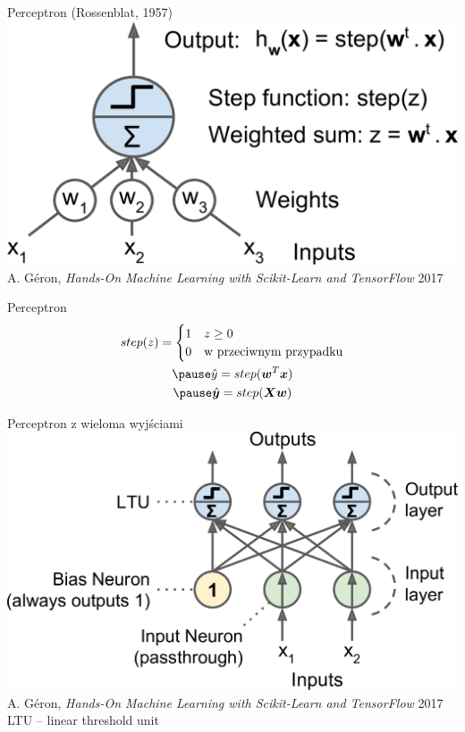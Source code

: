 \documentclass{sa}
\subtitle{Sieci neuronowe}
\renewcommand{\vec}[1]{\ensuremath\boldsymbol{#1}}
\begin{document}
\begin{frame}
\titlepage
\end{frame}

\begin{frame}{Perceptron (Rossenblat, 1957)}
\includegraphics[width=\textwidth]{perceptron.png}
{\vfill\footnotesize A. Géron, \emph{Hands-On Machine Learning with Scikit-Learn and TensorFlow} 2017}
\end{frame}

\begin{frame}{Perceptron}
\begin{gather*}
step(z) = \begin{cases} 1 & z \geq 0 \\ 0 & \text{w przeciwnym przypadku} \end{cases} \\
\pause
\hat{y} = step(\vec{w}^T\vec{x}) \\
\pause
\hat{\vec{y}} = step(\vec{X}\vec{w})
\end{gather*}
\end{frame}

\begin{frame}{Perceptron z wieloma wyjściami}
\includegraphics[width=\textwidth]{multioutput_perceptron.png}
{\vfill\footnotesize A. Géron, \emph{Hands-On Machine Learning with Scikit-Learn and TensorFlow} 2017}
{
LTU -- linear threshold unit
}
\end{frame}
\end{document}
